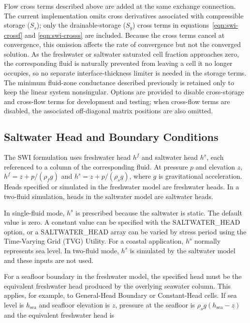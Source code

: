 \noindent Flow cross terms described above are added at the same exchange connection. The current implementation omits cross derivatives associated with compressible storage ($S_{s}$); only the drainable-storage ($S_{y}$) cross terms in equations~\ref{eqn:swi-crossf} and \ref{eqn:swi-crosss} are included. Because the cross terms cancel at convergence, this omission affects the rate of convergence but not the converged solution. As the freshwater or saltwater saturated cell fraction approaches zero, the corresponding fluid is naturally prevented from leaving a cell it no longer occupies, so no separate interface-thickness limiter is needed in the storage terms. The minimum fluid-zone conductance described previously is retained only to keep the linear system nonsingular. Options are provided to disable cross-storage and cross-flow terms for development and testing; when cross-flow terms are disabled, the associated off-diagonal matrix positions are also omitted.

\subsection{Saltwater Head and Boundary Conditions}
\label{sec:swi-bc}

The SWI formulation uses freshwater head $h^{f}$ and saltwater head $h^{s}$, each referenced to a column of the corresponding fluid. At pressure $p$ and elevation $z$, $h^{f}=z+p/(\rho_{f}g)$ and $h^{s}=z+p/(\rho_{s}g)$, where $g$ is gravitational acceleration. Heads specified or simulated in the freshwater model are freshwater heads. In a two-fluid simulation, heads in the saltwater model are saltwater heads.

In single-fluid mode, $h^{s}$ is prescribed because the saltwater is static. The default value is zero. A constant value can be specified with the SALTWATER\_HEAD option, or a SALTWATER\_HEAD array can be varied by stress period using the Time-Varying Grid (TVG) Utility. For a coastal application, $h^{s}$ normally represents sea level. In two-fluid mode, $h^{s}$ is simulated by the saltwater model and these inputs are not used.

For a seafloor boundary in the freshwater model, the specified head must be the equivalent freshwater head produced by the overlying seawater column. This applies, for example, to General-Head Boundary or Constant-Head cells. If sea level is $h_{\mathrm{sea}}$ and seafloor elevation is $z$, pressure at the seafloor is $\rho_{s}g(h_{\mathrm{sea}}-z)$ and the equivalent freshwater head is

